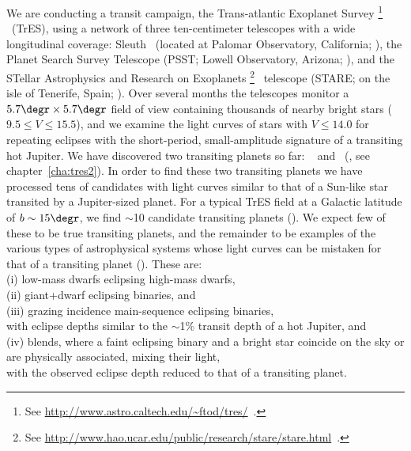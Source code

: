 We are conducting a transit campaign, the {Trans-atlantic Exoplanet Survey}%
\footnote{See \url{http://www.astro.caltech.edu/\~ftod/tres/}\ .}%
\ (TrES), using a network of three ten-centimeter telescopes with a wide longitudinal coverage:
{Sleuth}%
\footnotemark[\value{footnote}]%
\ (located at Palomar Observatory, California; \citealt{ODonovan_Charbonneau_Kotredes:AIP:2004a}), the Planet Search Survey Telescope (PSST; Lowell Observatory, Arizona; \citealt{Dunham_Mandushev_Taylor:pasp:2004a}),
and the STellar Astrophysics and Research on Exoplanets%
\footnote{See \url{http://www.hao.ucar.edu/public/research/stare/stare.html}\ .}%
\ telescope ({STARE}; on the isle of Tenerife, Spain; \citealt{Alonso_Deeg_Brown:an:2004a}). Over several months the telescopes monitor a $5.7\degr \times 5.7\degr$ field of view containing thousands of nearby bright stars ($9.5\leq V \leq 15.5$), and we examine the light curves of stars with $V\leq14.0$ for repeating eclipses with the short-period, small-amplitude signature of a transiting hot Jupiter. We have discovered two transiting planets so far: \tresOne\ \citep{Alonso_Brown_Torres:apjl:2004a} and \tresTwo\ (\citealp{ODonovan_Charbonneau_Mandushev:apjl:2006a}, see chapter~\ref{cha:tres2}). In order to find these two transiting planets we have processed tens of candidates with light curves similar to that of a Sun-like star transited by a Jupiter-sized planet. For a typical TrES field at a Galactic latitude of $b\sim15\degr$, we find $\sim$10 candidate transiting planets (\citealp[see, e.g.,][]{Dunham_Mandushev_Taylor:pasp:2004a}). We expect few of these to be true transiting planets, and the remainder to be examples of the various types of astrophysical systems whose light curves can be mistaken for that of a transiting planet (\citealp[see, e.g.,][]{Brown:apjl:2003a, Charbonneau_Brown_Dunham:AIP:2004a}). These are: \\ 
\indent (i) low-mass dwarfs eclipsing high-mass dwarfs, \\
(ii) giant+dwarf eclipsing binaries, and \\
(iii) grazing incidence main-sequence eclipsing binaries, \\
with eclipse depths similar to the $\sim$1\% transit depth of a hot Jupiter, and \\
(iv) blends, where a faint eclipsing binary and a bright star coincide on the sky or are physically associated, mixing their light, \\
with the observed eclipse depth reduced to that of a transiting planet.
